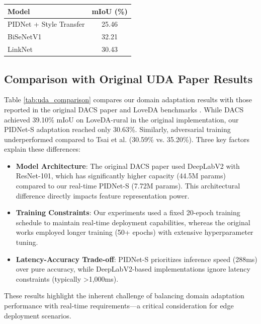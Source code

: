 \documentclass{article}
\begin{document}
\begin{multicols}{2}
\begin{center}
			\label{tab:extensions}
			\begin{tabular}{|l|c|}
				\hline
				Model & mIoU (\%) \\ \hline
				PIDNet + Style Transfer & 25.46 \\ \hline
				BiSeNetV1 & 32.21 \\ \hline
				LinkNet & 30.43 \\ \hline
			\end{tabular}
		\end{center} 

		\subsection{Comparison with Original UDA Paper Results}
		Table \ref{tab:uda_comparison} compares our domain adaptation results with those reported in the original DACS paper \cite{tranheden2021dacs} and LoveDA benchmarks \cite{loveda2021}. While DACS achieved 39.10\% mIoU on LoveDA-rural in the original implementation, our PIDNet-S adaptation reached only 30.63\%. Similarly, adversarial training underperformed compared to Tsai et al. \cite{tsai2018learning} (30.59\% vs. 35.20\%). Three key factors explain these differences:
		
		\begin{itemize}
			\item \textbf{Model Architecture}: The original DACS paper used DeepLabV2 with ResNet-101, which has significantly higher capacity (44.5M params) compared to our real-time PIDNet-S (7.72M params). This architectural difference directly impacts feature representation power.
			\item \textbf{Training Constraints}: Our experiments used a fixed 20-epoch training schedule to maintain real-time deployment capabilities, whereas the original works employed longer training (50+ epochs) with extensive hyperparameter tuning.
			\item \textbf{Latency-Accuracy Trade-off}: PIDNet-S prioritizes inference speed (288ms) over pure accuracy, while DeepLabV2-based implementations ignore latency constraints (typically >1,000ms).
		\end{itemize}
		
		\justifying
		These results highlight the inherent challenge of balancing domain adaptation performance with real-time requirements—a critical consideration for edge deployment scenarios.
		

\end{multicols}
\end{document}
